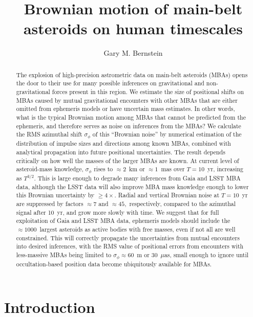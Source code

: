 \documentclass[linenumbers, onecolumn]{aastex631}
\begin{document}
\title{Brownian motion of main-belt asteroids on human timescales} 

\author[0000-0002-8613-8259]{Gary M. Bernstein}


\begin{abstract}
  The explosion of high-precision astrometric data on main-belt asteroids (MBAs) opens the door to their use for many possible inferences on gravitational and non-gravitational forces present in this region.  We estimate the size of positional shifts on MBAs caused by mutual gravitational encounters with other MBAs that are either omitted from ephemeris models or have uncertain mass estimates. In other words, what is the typical Brownian motion among MBAs that cannot be predicted from the ephemeris, and therefore serves as noise on inferences from the MBAs?  We calculate the RMS azimuthal shift $\sigma_\phi$ of this ``Brownian noise''  by numerical estimation of the distribution of impulse sizes and directions among known MBAs, combined with analytical propagation into future positional uncertainties.  The result depends critically on how well the masses of the larger MBAs are known.  At current level of asteroid-mass knowledge, $\sigma_\phi$ rises to $\approx2$~km or $\approx1$~mas over $T=10$~yr, increasing as $T^{3/2}.$  This is large enough to degrade many inferences from Gaia and LSST MBA data, although the LSST data will also improve MBA mass knowledge enough to lower this Brownian uncertainty by $\ge4\times.$  Radial and vertical Brownian noise  at $T=10$~yr are suppressed by factors $\approx7$ and $\approx45,$ respectively, compared to the azimuthal signal after 10~yr, and grow more slowly with time.  We suggest that for full exploitation of Gaia and LSST MBA data, ephemeris models should include the $\approx1000$~largest asteroids as active bodies with free masses, even if not all are well constrained.  This will correctly propagate the uncertainties from mutual encounters into desired inferences, with the RMS value of positional errors from encounters with less-massive MBAs being limited to $\sigma_\phi\approx60$~m or 30~$\mu$as, small enough to ignore until occultation-based position data become ubiquitously available for MBAs.
\end{abstract}


\section{Introduction}
\end{document}
